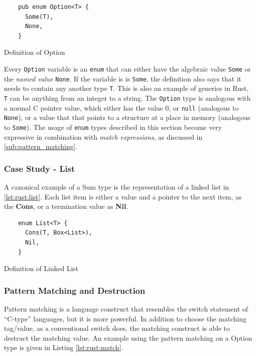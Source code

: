 \begin{listing}[H]
  \begin{verbatim}
    pub enum Option<T> {
      Some(T),
      None,
    }
  \end{verbatim}
  \caption{Definition of Option}
  \label{lst:rust:option}
\end{listing}

Every \texttt{Option} variable is an \texttt{enum} that can either have the algebraic value \texttt{Some} or the \emph{named value} \texttt{None}.
If the variable is is \texttt{Some}, the definition also says that it needs to contain any another type \texttt{T}.
This is also an example of generics in Rust, \texttt{T} can be anything from an integer to a string.
The \texttt{Option} type is analogous with a normal C pointer value, which either has the value 0, or \texttt{null} (analogous to \texttt{None}), or a value that that points to a structure at a place in memory (analogous to \texttt{Some}).
The usage of \texttt{enum} types described in this section become very expressive in combination with \emph{match expressions}, as discussed in \autoref{sub:pattern_matching}.

\subsubsection{Case Study - List}

A canonical example of a Sum type is the representation of a linked list in \autoref{lst:rust:list}.
Each list item is either a value and a pointer to the next item, as the \textbf{Cons}, or a termination value as \textbf{Nil}.

\begin{listing}[H]
  \begin{verbatim}
    enum List<T> {
      Cons(T, Box<List>),
      Nil,
    }
  \end{verbatim}
  \caption{Definition of Linked List}
  \label{lst:rust:list}
\end{listing}

\subsubsection{Pattern Matching and Destruction}
\label{sub:pattern_matching}

Pattern matching is a language construct that resembles the switch statement of ``C-type'' languages, but it is more powerful.
In addition to choose the matching tag/value, as a conventional switch does, the matching construct is able to destruct the matching value.
An example using the pattern matching on a Option type is given in Listing \ref{lst:rust:match}.

